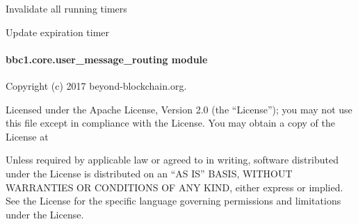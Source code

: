 \documentclass[letterpaper,10pt,english]{sphinxmanual}
\begin{document}
\begin{fulllineitems}
\begin{fulllineitems}
\label{\detokenize{bbc1.core.topology_manager:bbc1.core.topology_manager.TopologyManagerBase.stop_all_timers}}
Invalidate all running timers

\end{fulllineitems}


\begin{fulllineitems}
\label{\detokenize{bbc1.core.topology_manager:bbc1.core.topology_manager.TopologyManagerBase.update_refresh_timer_entry}}
Update expiration timer

\end{fulllineitems}


\end{fulllineitems}



\paragraph{bbc1.core.user\_message\_routing module}
\label{\detokenize{bbc1.core.user_message_routing::doc}}\label{\detokenize{bbc1.core.user_message_routing:bbc1-core-user-message-routing-module}}\label{\detokenize{bbc1.core.user_message_routing:module-bbc1.core.user_message_routing}}
Copyright (c) 2017 beyond-blockchain.org.

Licensed under the Apache License, Version 2.0 (the “License”);
you may not use this file except in compliance with the License.
You may obtain a copy of the License at
\begin{quote}

\end{quote}

Unless required by applicable law or agreed to in writing, software
distributed under the License is distributed on an “AS IS” BASIS,
WITHOUT WARRANTIES OR CONDITIONS OF ANY KIND, either express or implied.
See the License for the specific language governing permissions and
limitations under the License.
\end{document}
